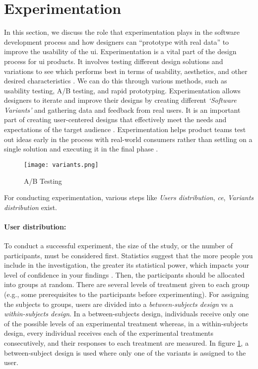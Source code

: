 \section{Experimentation}
\label{background:section:experimentproduct}
In this section, we discuss the role that experimentation plays in the software development process and how designers can ``prototype with real data'' to improve the usability of the \ac{ui}.
Experimentation is a vital part of the design process for \ac{ui} products. 
It involves testing different design solutions and variations to see which performs best in terms of usability, aesthetics, and other desired characteristics \cite{article:controlled:experiements}. 
We can do this through various methods, such as usability testing, A/B testing, and rapid prototyping.
Experimentation allows designers to iterate and improve their designs by creating different \textit{`Software Variants'} and gathering data and feedback from real users.
It is an important part of creating user-centered designs that effectively meet the needs and expectations of the target audience \cite{article:experiments:lindgren}.
Experimentation helps product teams test out ideas early in the process with real-world consumers rather than settling on a single solution and executing it in the final phase \cite{misc:CE:miklos}.

\begin{figure}[htbp!]
  \centering    
  \texttt{[image: variants.png]}
  \caption[A/B Testing]{A/B Testing} 
  \label{fig:background:abtesting}
\end{figure}
For conducting experimentation, various steps like \textit{Users distribution}, \textit{\ac{ce}}, \textit{Variants distribution} exist.

\paragraph{User distribution:} To conduct a successful experiment, the size of the study, or the number of participants, must be considered first.
Statistics suggest that the more people you include in the investigation, the greater its statistical power, which impacts your level of confidence in your findings \cite{misc:experimentation:users}.
Then, the participants should be allocated into groups at random. 
There are several levels of treatment given to each group (e.g., some prerequisites to the participants before experimenting).
For assigning the subjects to groups, users are divided into a \textit{between-subjects design} vs a \textit{within-subjects design}.
In a between-subjects design, individuals receive only one of the possible levels of an experimental treatment whereas, in a within-subjects design, every individual receives each of the experimental treatments consecutively, and their responses to each treatment are measured.
In figure \ref{fig:background:abtesting}, a between-subject design is used where only one of the variants is assigned to the user.

